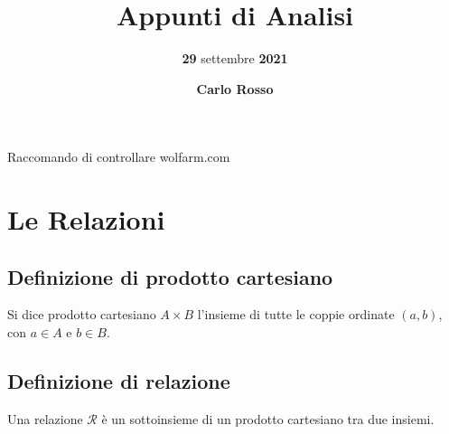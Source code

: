 \documentclass{article}
\title{\vspace{4cm}\textbf{Appunti di Analisi}}
\author{\textbf{29} settembre \textbf{2021}}
\date{\vspace{2mm}\textbf{Carlo Rosso}}
\begin{document}
\setcounter{secnumdepth}{1}

\begin{titlepage}
	\maketitle
	\thispagestyle{empty}
\end{titlepage}

\tableofcontents

\newpage

Raccomando di controllare wolfarm.com


\newpage

\section{Le Relazioni}

\subsection{Definizione di prodotto cartesiano}
Si dice prodotto cartesiano $A \times B$ l'insieme di tutte le coppie ordinate $(a,b)$, con $a \in A$ e $b \in B$.


\subsection{Definizione di relazione}
Una relazione $\mathcal{R}$ è un sottoinsieme di un prodotto cartesiano tra due insiemi.
\end{document}
